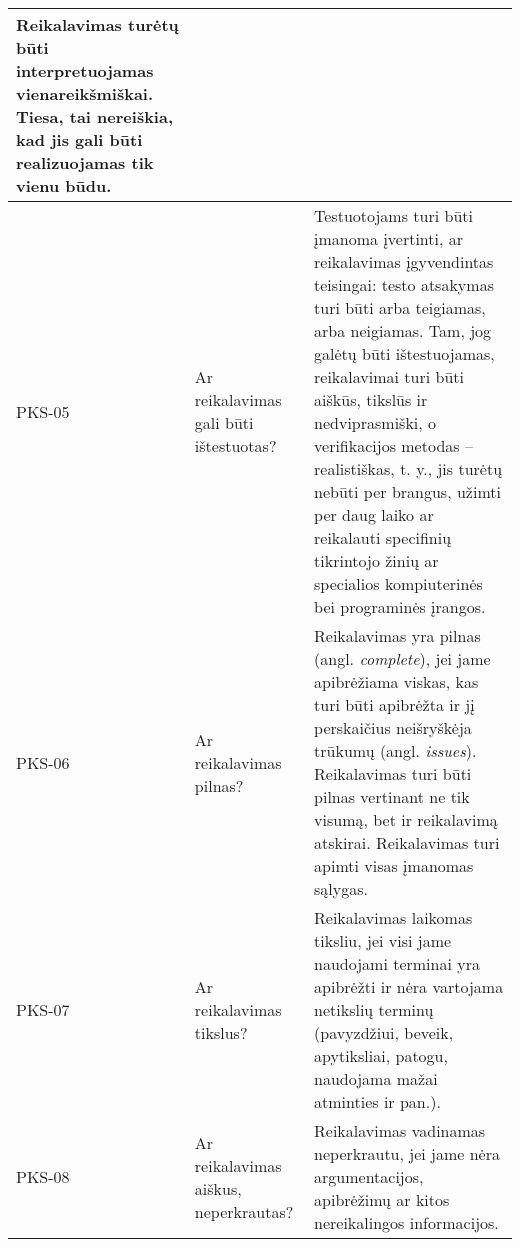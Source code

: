 \documentclass{VUMIFPSkursinis}
\begin{document}
\begin{center}
\begin{longtable}{|C{2cm}|L{5cm}|L{8cm}|}
		Reikalavimas turėtų būti interpretuojamas \textbf{vienareikšmiškai}. Tiesa, tai nereiškia, kad jis gali būti realizuojamas tik vienu būdu.                                                                                                                                                                                                                                                                                                    \\ \hline
		PKS-05                                                                        &
		Ar reikalavimas gali būti ištestuotas?                                        &
		Testuotojams turi būti įmanoma įvertinti, ar reikalavimas įgyvendintas teisingai: testo atsakymas turi būti arba teigiamas, arba neigiamas. Tam, jog galėtų būti ištestuojamas, reikalavimai turi būti aiškūs, tikslūs ir nedviprasmiški, o verifikacijos metodas -- realistiškas, t. y., jis turėtų nebūti per brangus, užimti per daug laiko ar reikalauti specifinių tikrintojo žinių ar specialios kompiuterinės bei programinės įrangos. \\ \hline
		PKS-06                                                                        &
		Ar reikalavimas pilnas?                                                       &
		Reikalavimas yra pilnas (angl. \textit{complete}), jei jame apibrėžiama viskas, kas turi būti apibrėžta ir jį perskaičius neišryškėja trūkumų (angl. \textit{issues}). Reikalavimas turi būti pilnas vertinant ne tik visumą, bet ir reikalavimą atskirai. Reikalavimas turi apimti visas įmanomas sąlygas.                                                                                                                                   \\ \hline
		PKS-07                                                                        &
		Ar reikalavimas tikslus?                                                      &
		Reikalavimas laikomas tiksliu, jei visi jame naudojami terminai yra apibrėžti ir nėra vartojama netikslių terminų (pavyzdžiui, beveik, apytiksliai, patogu, naudojama mažai atminties ir pan.).                                                                                                                                                                                                                                               \\ \hline
		PKS-08                                                                        &
		Ar reikalavimas aiškus, neperkrautas?                                         &
		Reikalavimas vadinamas neperkrautu, jei jame nėra argumentacijos, apibrėžimų ar kitos nereikalingos informacijos.                                                                                                                                                                                                                                                                                                                             \\ \hline

\end{longtable}
\end{center}
\end{document}
